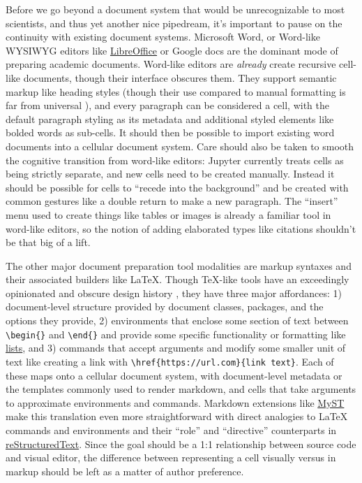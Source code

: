 Before we go beyond a document system that would be unrecognizable to
most scientists, and thus yet another nice pipedream, it's important to
pause on the continuity with existing document systems. Microsoft Word,
or Word-like WYSIWYG editors like
\href{https://www.libreoffice.org/}{LibreOffice} or Google docs are the
dominant mode of preparing academic documents. Word-like editors are
\emph{already} create recursive cell-like documents, though their
interface obscures them. They support semantic markup like heading
styles (though their use compared to manual formatting is far from
universal \citep{sorgaardUseParagraphStyles1996} ), and every
paragraph can be considered a cell, with the default paragraph styling
as its metadata and additional styled elements like bolded words as
sub-cells. It should then be possible to import existing word documents
into a cellular document system. Care should also be taken to smooth the
cognitive transition from word-like editors: Jupyter currently treats
cells as being strictly separate, and new cells need to be created
manually. Instead it should be possible for cells to ``recede into the
background'' and be created with common gestures like a double return to
make a new paragraph. The ``insert'' menu used to create things like
tables or images is already a familiar tool in word-like editors, so the
notion of adding elaborated types like citations shouldn't be that big
of a lift.

The other major document preparation tool modalities are markup syntaxes
and their associated builders like LaTeX. Though TeX-like tools have an
exceedingly opinionated and obscure design history \citep{knuthTeXbook1986} , they have three major affordances: 1)
document-level structure provided by document classes, packages, and the
options they provide, 2) environments that enclose some section of text
between \texttt{\textbackslash{}begin\{\}} and
\texttt{\textbackslash{}end\{\}} and provide some specific functionality
or formatting like
\href{https://www.overleaf.com/learn/latex/Lists}{lists}, and 3)
commands that accept arguments and modify some smaller unit of text like
creating a link with
\texttt{\textbackslash{}href\{https://url.com\}\{link\ text\}}. Each of
these maps onto a cellular document system, with document-level metadata
or the templates commonly used to render markdown, and cells that take
arguments to approximate environments and commands. Markdown extensions
like \href{https://myst-parser.readthedocs.io/en/latest/}{MyST} \citep{dupreAdvertisingNewInfrastructures2022}  make this translation
even more straightforward with direct analogies to LaTeX commands and
environments and their ``role'' and ``directive'' counterparts in
\href{https://www.sphinx-doc.org/en/master/usage/restructuredtext/basics.html}{reStructuredText}.
Since the goal should be a 1:1 relationship between source code and
visual editor, the difference between representing a cell visually
versus in markup should be left as a matter of author preference.

